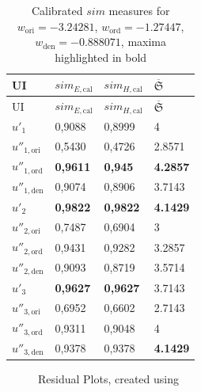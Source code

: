 \hypertarget{tbl:ci:sim-calibrated}{}
\begin{longtable}[]{@{}llll@{}}
\caption{\label{tbl:ci:sim-calibrated}Calibrated \(sim\) measures for \(w_{\text{ori}}=-3.24281\), \(w_{\text{ord}}=-1.27447\), \(w_{\text{den}}=-0.888071\), maxima highlighted in bold}\tabularnewline
\toprule
UI & \(sim_{E,\text{cal}}\) & \(sim_{H,\text{cal}}\) & \(\overline{\mathfrak{S}}\)\tabularnewline
\midrule
\endfirsthead
\toprule
UI & \(sim_{E,\text{cal}}\) & \(sim_{H,\text{cal}}\) & \(\overline{\mathfrak{S}}\)\tabularnewline
\midrule
\endhead
\(u'_1\) & 0,9088 & 0,8999 & 4\tabularnewline
\(u''_{1,\text{ori}}\) & 0,5430 & 0,4726 & 2.8571\tabularnewline
\(u''_{1,\text{ord}}\) & \textbf{0,9611} & \textbf{0,945} & \textbf{4.2857}\tabularnewline
\(u''_{1,\text{den}}\) & 0,9074 & 0,8906 & 3.7143\tabularnewline
\(u'_2\) & \textbf{0,9822} & \textbf{0,9822} & \textbf{4.1429}\tabularnewline
\(u''_{2,\text{ori}}\) & 0,7487 & 0,6904 & 3\tabularnewline
\(u''_{2,\text{ord}}\) & 0,9431 & 0,9282 & 3.2857\tabularnewline
\(u''_{2,\text{den}}\) & 0,9093 & 0,8719 & 3.5714\tabularnewline
\(u'_3\) & \textbf{0,9627} & \textbf{0,9627} & 3.7143\tabularnewline
\(u''_{3,\text{ori}}\) & 0,6952 & 0,6602 & 2.7143\tabularnewline
\(u''_{3,\text{ord}}\) & 0,9311 & 0,9048 & 4\tabularnewline
\(u''_{3,\text{den}}\) & 0,9378 & 0,9378 & \textbf{4.1429}\tabularnewline
\bottomrule
\end{longtable}

\begin{figure}
\centering


\caption{Residual Plots, created using \autocite{Wessa2017Statistics}}

\label{fig:ci.residuals}

\end{figure}

